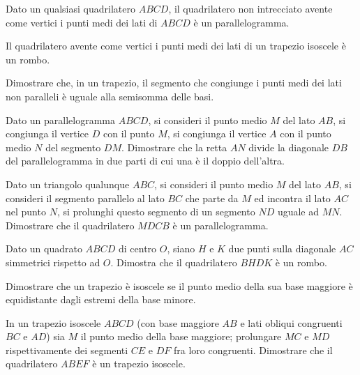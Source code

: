 \begin{multicols}{2}
\begin{esercizio}
\label{ese:4.36}
Dato un qualsiasi quadrilatero $ABCD$, il quadrilatero non 
intrecciato avente come vertici i punti medi dei lati di $ABCD$ è un 
parallelogramma.
\end{esercizio}

\begin{esercizio}
\label{ese:4.37}
Il quadrilatero avente come vertici i punti medi dei lati di un 
trapezio isoscele è un rombo.
\end{esercizio}

\begin{esercizio}
\label{ese:4.38}
Dimostrare che, in un trapezio, il segmento che congiunge i punti 
medi dei lati non paralleli è uguale alla semisomma delle basi.
\end{esercizio}

\begin{esercizio}
\label{ese:4.39}
Dato un parallelogramma $ABCD$, si consideri il punto medio $M$ del 
lato $AB$, si congiunga il vertice $D$ con il punto $M$, si congiunga 
il vertice $A$ con il punto medio $N$ del segmento $DM$. Dimostrare 
che la retta $AN$ divide la diagonale $DB$ del parallelogramma in due 
parti di cui una è il doppio dell'altra.
\end{esercizio}

\begin{esercizio}
\label{ese:4.40}
Dato un triangolo qualunque $ABC$, si consideri il punto medio $M$ 
del lato $AB$, si consideri il segmento parallelo al lato $BC$ che 
parte da $M$ ed incontra il lato $AC$ nel punto $N$, si prolunghi 
questo segmento di un segmento $ND$ uguale ad $MN$. Dimostrare che il 
quadrilatero $MDCB$ è un parallelogramma.
\end{esercizio}

\begin{esercizio}
\label{ese:4.41}
Dato un quadrato $ABCD$ di centro $O$, siano $H$ e $K$ due punti 
sulla diagonale $AC$ simmetrici rispetto ad $O$. Dimostra che il 
quadrilatero $BHDK$ è un rombo. 
\end{esercizio}

\begin{esercizio}
\label{ese:4.42}
Dimostrare che un trapezio è isoscele se il punto medio della sua 
base maggiore è equidistante dagli estremi della base minore.
\end{esercizio}

\begin{esercizio}
\label{ese:4.43}
In un trapezio isoscele $ABCD$ (con base maggiore $AB$ e lati obliqui 
congruenti $BC$ e $AD$) sia $M$ il punto medio della base maggiore; 
prolungare $MC$ e $MD$ rispettivamente dei segmenti $CE$ e $DF$ fra 
loro congruenti. Dimostrare che il quadrilatero $ABEF$ è un trapezio 
isoscele.
\end{esercizio}


\end{multicols}
